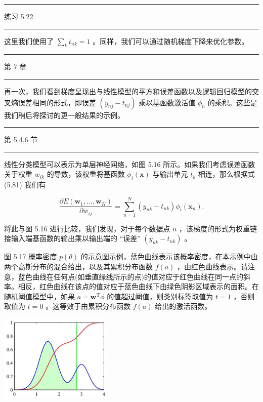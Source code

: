 \documentclass[10pt]{report}
\newcommand{\HRule}{\begin{center}\rule{0.9\linewidth}{0.2mm}\end{center}}
\begin{document}
\HRule

练习 5.22

\HRule

这里我们使用了 \(\mathop{\sum }\limits_{k}{t}_{nk} = 1\) 。同样，我们可以通过随机梯度下降来优化参数。

\HRule

第 7 章

\HRule

再一次，我们看到梯度呈现出与线性模型的平方和误差函数以及逻辑回归模型的交叉熵误差相同的形式，即误差 \(\left( {{y}_{nj} - {t}_{nj}}\right)\) 乘以基函数激活值 \({\phi }_{n}\) 的乘积。这些是我们稍后将探讨的更一般结果的示例。

\HRule

第 5.4.6 节

\HRule

线性分类模型可以表示为单层神经网络，如图 5.16 所示。如果我们考虑误差函数关于权重 \({w}_{ik}\) 的导数，该权重将基函数 \({\phi }_{i}\left( \mathbf{x}\right)\) 与输出单元 \({t}_{k}\) 相连，那么根据式 (5.81) 我们有

\[
\frac{\partial E\left( {{\mathbf{w}}_{1},\ldots ,{\mathbf{w}}_{K}}\right) }{\partial {w}_{ij}} = \mathop{\sum }\limits_{{n = 1}}^{N}\left( {{y}_{nk} - {t}_{nk}}\right) {\phi }_{i}\left( {\mathbf{x}}_{n}\right) . \tag{5.82}
\]

将此与图 5.16 进行比较，我们发现，对于每个数据点 \(n\) ，该梯度的形式为权重链接输入端基函数的输出乘以输出端的 “误差” \(\left( {{y}_{nk} - {t}_{nk}}\right)\) 。

图 5.17 概率密度 \(p\left( \theta \right)\) 的示意图示例，蓝色曲线表示该概率密度，在本示例中由两个高斯分布的混合给出，以及其累积分布函数 \(f\left( a\right)\) ，由红色曲线表示。请注意，蓝色曲线在任何点(如垂直绿线所示的点)的值对应于红色曲线在同一点的斜率。相反，红色曲线在该点的值对应于蓝色曲线下由绿色阴影区域表示的面积。在随机阈值模型中，如果 \(a = {\mathbf{w}}^{\mathrm{T}}\phi\) 的值超过阈值，则类别标签取值为 \(t = 1\) ，否则取值为 \(t = 0\) 。这等效于由累积分布函数 \(f\left( a\right)\) 给出的激活函数。

\begin{center}
\includegraphics[max width=0.4\textwidth]{images/0194e279-9b28-703a-88f4-c3ac21e2010d_182_941_361_559_434_0.jpg}
\end{center}
\hspace*{3em} 
\end{document}
